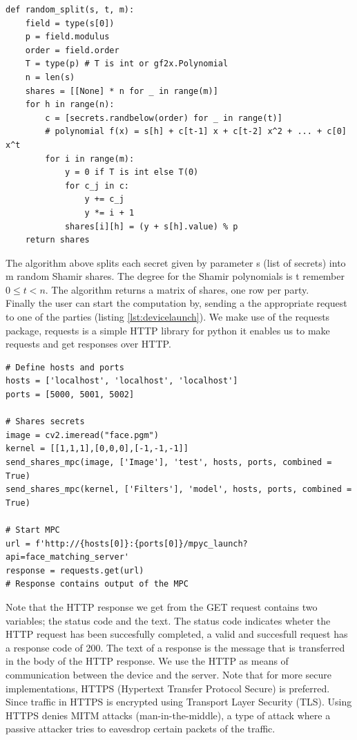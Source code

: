 \begin{lstlisting}[caption={Shamir secret sharing algorithm (part of MPyC framework)}, label={lst:ssss}, frame=single, breaklines=true]
def random_split(s, t, m):
    field = type(s[0])
    p = field.modulus
    order = field.order
    T = type(p) # T is int or gf2x.Polynomial
    n = len(s)
    shares = [[None] * n for _ in range(m)]
    for h in range(n):
        c = [secrets.randbelow(order) for _ in range(t)]
        # polynomial f(x) = s[h] + c[t-1] x + c[t-2] x^2 + ... + c[0] x^t
        for i in range(m):
            y = 0 if T is int else T(0)
            for c_j in c:
                y += c_j
                y *= i + 1
            shares[i][h] = (y + s[h].value) % p
    return shares
\end{lstlisting}

The algorithm above splits each secret given by parameter s (list of secrets) into m random Shamir shares. The degree for the Shamir polynomials is t remember  $0 \leq t < n$. The algorithm returns a matrix of shares, one row per party.\\

Finally the user can start the computation by, sending a the appropriate request to one of the parties (listing \ref{lst:devicelaunch}). We make use of the requests package, requests is a simple HTTP library for python it enables us to make requests and get responses over HTTP.

\begin{lstlisting}[caption={Sending request for secure face matching task}, label={lst:devicelaunch}, frame=single, breaklines=true]
# Define hosts and ports
hosts = ['localhost', 'localhost', 'localhost']
ports = [5000, 5001, 5002]

# Shares secrets
image = cv2.imeread("face.pgm")
kernel = [[1,1,1],[0,0,0],[-1,-1,-1]]
send_shares_mpc(image, ['Image'], 'test', hosts, ports, combined = True)
send_shares_mpc(kernel, ['Filters'], 'model', hosts, ports, combined = True)

# Start MPC
url = f'http://{hosts[0]}:{ports[0]}/mpyc_launch?api=face_matching_server'
response = requests.get(url)
# Response contains output of the MPC
\end{lstlisting}

Note that the HTTP response we get from the GET request contains two variables; the status code and the text. The status code indicates wheter the HTTP request has been  succesfully completed, a valid and succesfull request has a response code of 200. The text of a response is the message that is transferred in the body of the HTTP response. We use the HTTP as means of communication between the device and the server. Note that for more secure implementations, HTTPS (Hypertext Transfer Protocol Secure) is preferred. Since traffic in HTTPS is encrypted using Transport Layer Security (TLS). Using HTTPS denies MITM attacks (man-in-the-middle), a type of attack where a passive attacker tries to eavesdrop certain packets of the traffic.\\

